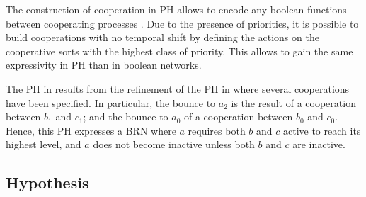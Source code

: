 The construction of cooperation in PH allows to encode any boolean functions between cooperating processes \cite{PMR10-TCSB}.
Due to the presence of priorities, it is possible to build cooperations with no temporal shift by defining the actions on the cooperative sorts with the highest class of priority.
This allows to gain the same expressivity in PH than in boolean networks.

\begin{example}
The PH in  results from the refinement of the PH in 
where several cooperations have been specified.
In particular, the bounce to $a_2$ is the result of a cooperation between $b_1$ and $c_1$; and the
bounce to $a_0$ of a cooperation between $b_0$ and $c_0$.
Hence, this PH expresses a BRN where $a$ requires both $b$ and $c$ active to reach its
highest level, and $a$ does not become inactive unless both $b$ and $c$ are inactive.
\end{example}

\subsection{Hypothesis} 
\label{ssec:hypothesis}


\begin{comment}
We define the set of chains of actions $\PHh^n(b, a)$ between two sorts $b$ and $a$, with $n \in \segm{1}{k}$, as below:
\begin{align*}
\PHh^n(b, a) = \{ (h_i)_{i \in \segm{0}{s}} \in (\restriction{\PHh}{n})^{s+1} &\mid s \in \sN, \PHsort(\PHhitter(h_0)) = b \wedge \PHsort(\PHtarget(h_s)) = a \\
  & \wedge \forall i \in \segm{1}{s}, \PHsort(\PHtarget(h_{i-1})) = \PHsort(\PHhitter(h_{i})) \}
\end{align*}

We define the neighbor \towrite{Revoir terminologie : “neighborhood” ? “vicinity” ?} sorts of any sort $a$ and $n \in \segm{1}{k}$ as :
$$
\Vs^n(a) = \{ b \in \PHs \mid \PHh^m(b, a) \neq \emptyset \wedge m = \min(n, \prio(a)) \} \cup \{ a \}
$$

And, as a shortcut:
$$
\Vs(a) = \Vs^{\prio(a)}(a)
$$

We define the neighbor actions of any sort $a$ as :
$$
\Vh(a) = \{ h \in \restriction{\PHh}{\prio(a)} \mid \{ \PHsort(\PHhitter(h)), \PHsort(\PHtarget(h)) \} \subset \Vs(a) \wedge \prio(h) \leq \prio(a) \}
$$
\end{comment}

